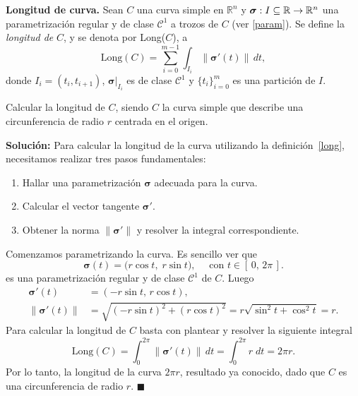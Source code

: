\begin{definition}\label{long}\textbf{Longitud de curva.}
    Sean $C$ una curva simple en $\mathbb{R}^n$ y  $\boldsymbol{\sigma}:I\subseteq\mathbb{R}\to\mathbb{R}^n$ una parametrizaci\'on regular y  de clase $\mathcal{C}^1$ a trozos de $C$  (ver\: \ref{param}). Se define la \emph{longitud de} $C$, y se denota por  Long($C$), a 
    \[
        \text{Long}(C)=\sum_{i=0}^{m-1}\int_{I_i}\|\boldsymbol{\sigma}'(t) \|\,dt ,    
    \]
   donde $ I_i= (t_i, t_{i+1})$,  $\boldsymbol{\sigma}\rvert_{I_i}$ es de clase $\mathcal{C}^1$  y  $\{t_i\}_{i=0}^{m}$  es una partici\'on de $I$.
\end{definition}



\begin{example}
  Calcular la longitud de $C$,  siendo $C$  la curva simple  que describe una circunferencia de radio $r$ centrada en el origen. 
  \end{example}  


\noindent\textbf{Solución:}  Para calcular la longitud de la curva utilizando la definición~\ref{long}, necesitamos realizar tres pasos fundamentales:
\begin{enumerate}
    \item Hallar una parametrización $\boldsymbol{\sigma}$ adecuada para la  curva. 
    \item Calcular el vector tangente $\boldsymbol{\sigma}'$.  
    \item Obtener la norma $\|\boldsymbol{\sigma}'\|$ y resolver la integral correspondiente. 
\end{enumerate}

\noindent Comenzamos parametrizando la curva. Es sencillo ver que 
        \[
            \boldsymbol{\sigma}(t) 
            = 
            \bigl(r\cos t,\;r\sin t\bigr), \quad
            \text{ con } t\in [\,0,\,2\pi\,].
        \] 
       es una parametrización regular y de clase  \(\mathcal{C}^1\)  de $C$. Luego  
        \begin{align*} 
\boldsymbol{\sigma}'(t) &= (-r\sin t,\, r\cos t), \\[0.2cm]
\|\boldsymbol{\sigma}'(t)\| &= \sqrt{(-r\sin t)^2 + (r\cos t)^2} = r\sqrt{\sin^2 t + \cos^2 t} = r. 
\end{align*} 
       Para calcular la longitud de $C$  basta con plantear y resolver la siguiente integral
        \[
            \text{Long}(C)
            =
            \int_{0}^{2\pi} \bigl\|\boldsymbol{\sigma}'(t)\bigr\| \, dt
            =
            \int_{0}^{2\pi} r \; dt
            =
            2\pi r.
        \]
        Por lo tanto, la  longitud de la curva \(2\pi r\), resultado ya conocido, dado que $C$ es una circunferencia de radio \(r\).  \hfill $\blacksquare$ 
  
